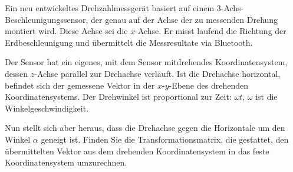 Ein neu entwickeltes Drehzahlmessgerät basiert auf einem
3-Achs-Beschleunigungs\-sensor, der genau auf der Achse der zu
messenden Drehung montiert wird. Diese Achse sei die $x$-Achse.
Er misst laufend die Richtung der Erdbeschleunigung und übermittelt
die Messresultate via Bluetooth.

Der Sensor hat ein eigenes, mit dem Sensor mitdrehendes Koordinatensystem,
dessen $z$-Achse parallel zur Drehachse verläuft.
Ist die Drehachse horizontal, befindet sich der gemessene Vektor
in der $x$-$y$-Ebene des drehenden Koordinatensystems.
Der Drehwinkel ist proportional zur Zeit: $\omega t$, $\omega$ ist die
Winkelgeschwindigkeit.

Nun stellt sich aber heraus, dass die Drehachse
gegen die Horizontale um den Winkel $\alpha$ geneigt ist. 
Finden Sie die Transformationsmatrix, die gestattet, den übermittelten Vektor
aus dem drehenden Koordinatensystem in das feste Koordinatensystem
umzurechnen.


